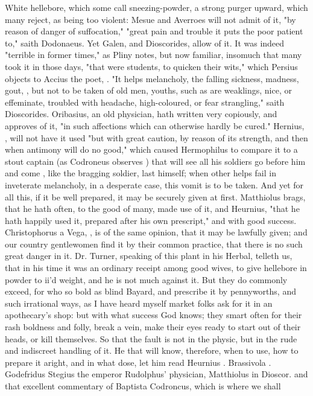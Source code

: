 {White hellebore, which some call sneezing-powder, a strong purger upward, which many reject, as being too violent: Mesue and Averroes will not admit of it, "by reason of danger of suffocation," "great pain and trouble it puts the poor patient to," saith Dodonaeus. Yet Galen,  and Dioscorides,  allow of it. It was indeed "terrible in former times," as Pliny notes, but now familiar, insomuch that many took it in those days, "that were students, to quicken their wits," which Persius  objects to Accius the poet, . "It helps melancholy, the falling sickness, madness, gout, \etc{}, but not to be taken of old men, youths, such as are weaklings, nice, or effeminate, troubled with headache, high-coloured, or fear strangling," saith Dioscorides. Oribasius, an old physician, hath written very copiously, and approves of it, "in such affections which can otherwise hardly be cured." Hernius, , will not have it used "but with great caution, by reason of its strength, and then when antimony will do no good," which caused Hermophilus to compare it to a stout captain (as Codroneus observes ) that will see all his soldiers go before him and come , like the bragging soldier, last himself; when other helps fail in inveterate melancholy, in a desperate case, this vomit is to be taken. And yet for all this, if it be well prepared, it may be securely given at first. Matthiolus brags, that he hath often, to the good of many, made use of it, and Heurnius, "that he hath happily used it, prepared after his own prescript," and with good success. Christophorus a Vega, , is of the same opinion, that it may be lawfully given; and our country gentlewomen find it by their common practice, that there is no such great danger in it. Dr. Turner, speaking of this plant in his Herbal, telleth us, that in his time it was an ordinary receipt among good wives, to give hellebore in powder to ii'd weight, and he is not much against it. But they do commonly exceed, for who so bold as blind Bayard, and prescribe it by pennyworths, and such irrational ways, as I have heard myself market folks ask for it in an apothecary's shop: but with what success God knows; they smart often for their rash boldness and folly, break a vein, make their eyes ready to start out of their heads, or kill themselves. So that the fault is not in the physic, but in the rude and indiscreet handling of it. He that will know, therefore, when to use, how to prepare it aright, and in what dose, let him read Heurnius . Brassivola . Godefridus Stegius the emperor Rudolphus' physician,  Matthiolus in Dioscor. and that excellent commentary of Baptista Codroncus, which is  where we shall }
